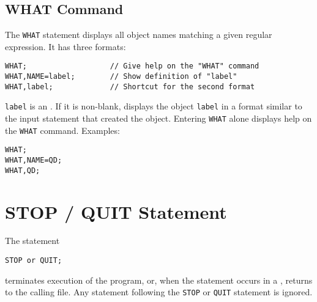 \subsection{WHAT Command}
\label{sec:what}
The \texttt{WHAT} statement displays all object names matching a given
regular expression.
It has three formats:
\begin{verbatim}
WHAT;                   // Give help on the "WHAT" command
WHAT,NAME=label;        // Show definition of "label"
WHAT,label;             // Shortcut for the second format
\end{verbatim}
\texttt{label} is an .
If it is non-blank,
\opal displays the object \texttt{label} in a format similar to the
input statement that created the object. 
Entering \texttt{WHAT} alone displays help on the \texttt{WHAT}
command. 
\noindent Examples:
\begin{verbatim}
WHAT;
WHAT,NAME=QD;
WHAT,QD;
\end{verbatim}

\section{STOP / QUIT Statement}
\label{sec:stop}
The statement
\begin{verbatim}
STOP or QUIT;
\end{verbatim}
terminates execution of the \opal program,
or, when the statement occurs in a ,
returns to the calling file.
Any statement following the \texttt{STOP} or  \texttt{QUIT} statement is ignored.

